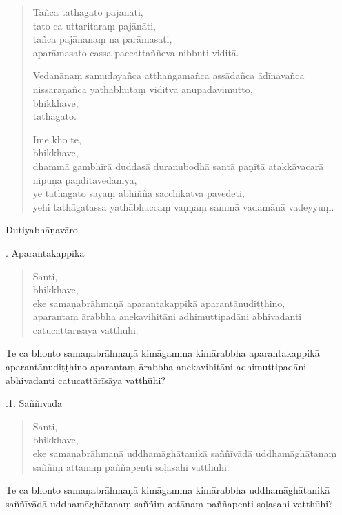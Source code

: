 \documentclass[11pt,twoside,openright]{book}
\begin{document}
\begin{verse}
Tañca tathāgato pajānāti,\\
\vin  tato ca uttaritaraṃ pajānāti,\\
\vin  tañca pajānanaṃ na parāmasati,\\
\vin  aparāmasato cassa paccattaññeva nibbuti viditā.

Vedanānaṃ samudayañca atthaṅgamañca assādañca ādīnavañca nissaraṇañca yathābhūtaṃ viditvā anupādāvimutto,\\
\vin  bhikkhave,\\
\vin  tathāgato.

Ime kho te,\\
\vin  bhikkhave,\\
\vin  dhammā gambhīrā duddasā duranubodhā santā paṇītā atakkāvacarā nipuṇā paṇḍitavedanīyā,\\
\vin  ye tathāgato sayaṃ abhiññā sacchikatvā pavedeti,\\
\vin  yehi tathāgatassa yathābhuccaṃ vaṇṇaṃ sammā vadamānā vadeyyuṃ.

\end{verse}
\pstart
Dutiyabhāṇavāro.
\pend

. Aparantakappika
\pend

\begin{verse}
Santi,\\
\vin  bhikkhave,\\
\vin  eke samaṇabrāhmaṇā aparantakappikā aparantānudiṭṭhino,\\
\vin  aparantaṃ ārabbha anekavihitāni adhimuttipadāni abhivadanti catucattārīsāya vatthūhi.

\end{verse}
\pstart
Te ca bhonto samaṇabrāhmaṇā kimāgamma kimārabbha aparantakappikā aparantānudiṭṭhino aparantaṃ ārabbha anekavihitāni adhimuttipadāni abhivadanti catucattārīsāya vatthūhi?
\pend

.1. Saññīvāda
\pend

\begin{verse}
Santi,\\
\vin  bhikkhave,\\
\vin  eke samaṇabrāhmaṇā uddhamāghātanikā saññīvādā uddhamāghātanaṃ saññiṃ attānaṃ paññapenti soḷasahi vatthūhi.

\end{verse}
\pstart
Te ca bhonto samaṇabrāhmaṇā kimāgamma kimārabbha uddhamāghātanikā saññīvādā uddhamāghātanaṃ saññiṃ attānaṃ paññapenti soḷasahi vatthūhi?
\pend
\end{document}

